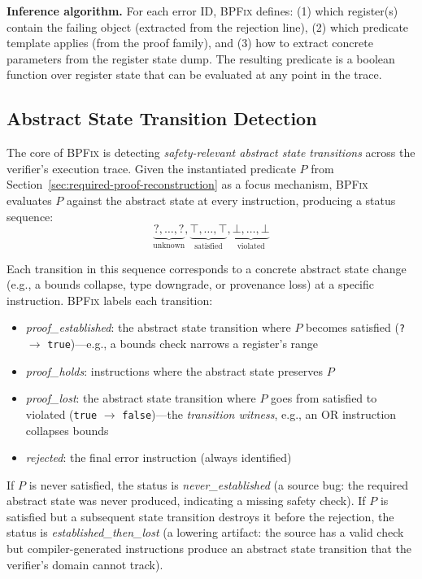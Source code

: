 \documentclass[sigplan,10pt,anonymous,review]{acmart}
\newcommand{\sys}{\textsc{BPFix}\xspace}
\begin{document}
\textbf{Inference algorithm.}  For each error ID, \sys defines:
(1) which register(s) contain the failing object (extracted from the rejection
line), (2) which predicate template applies (from the proof family), and
(3) how to extract concrete parameters from the register state dump.  The
resulting predicate is a boolean function over register state that can be
evaluated at any point in the trace.

\subsection{Abstract State Transition Detection}

The core of \sys is detecting \emph{safety-relevant abstract state transitions}
across the verifier's execution trace.  Given the instantiated predicate $P$
from Section~\ref{sec:required-proof-reconstruction} as a focus mechanism, \sys
evaluates $P$ against the abstract state at every instruction, producing a
status sequence:
\[
  \underbrace{?, \ldots, ?}_{\text{unknown}},
  \underbrace{\top, \ldots, \top}_{\text{satisfied}},
  \underbrace{\bot, \ldots, \bot}_{\text{violated}}
\]

Each transition in this sequence corresponds to a concrete abstract state
change (e.g., a bounds collapse, type downgrade, or provenance loss) at a
specific instruction.  \sys labels each transition:
\begin{itemize}
  \item \emph{proof\_established}: the abstract state transition where $P$ becomes
        satisfied (\texttt{?} $\to$ \texttt{true})---e.g., a bounds check
        narrows a register's range
  \item \emph{proof\_holds}: instructions where the abstract state preserves $P$
  \item \emph{proof\_lost}: the abstract state transition where $P$ goes from
        satisfied to violated (\texttt{true} $\to$ \texttt{false})---the
        \emph{transition witness}, e.g., an OR instruction collapses bounds
  \item \emph{rejected}: the final error instruction (always identified)
\end{itemize}

If $P$ is never satisfied, the status is \textit{never\_established} (a source
bug: the required abstract state was never produced, indicating a missing safety
check).
If $P$ is satisfied but a subsequent state transition destroys it before the
rejection, the status is \textit{established\_then\_lost} (a lowering artifact:
the source has a valid check but compiler-generated instructions produce an
abstract state transition that the verifier's domain cannot track).
\end{document}
